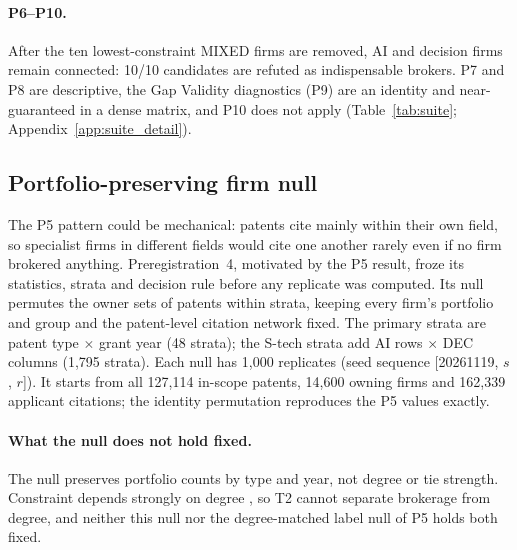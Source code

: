 \paragraph{P6--P10.} After the ten lowest-constraint MIXED firms are removed, AI and decision firms remain connected: 10/10 candidates are refuted as indispensable brokers. P7 and P8 are descriptive, the Gap Validity diagnostics (P9) are an identity and near-guaranteed in a dense matrix, and P10 does not apply (Table~\ref{tab:suite}; Appendix~\ref{app:suite_detail}).

\subsection{Portfolio-preserving firm null}
\label{sec:study2_firm}

The P5 pattern could be mechanical: patents cite mainly within their own field, so specialist firms in different fields would cite one another rarely even if no firm brokered anything. Preregistration~4, motivated by the P5 result, froze its statistics, strata and decision rule before any replicate was computed. Its null permutes the owner sets of patents within strata, keeping every firm's portfolio and group and the patent-level citation network fixed. The primary strata are patent type $\times$ grant year (48 strata); the S-tech strata add AI rows $\times$ DEC columns (1,795 strata). Each null has 1,000 replicates (seed sequence [20261119, $s$, $r$]). It starts from all 127,114 in-scope patents, 14,600 owning firms and 162,339 applicant citations; the identity permutation reproduces the P5 values exactly.

\paragraph{What the null does not hold fixed.} The null preserves portfolio counts by type and year, not degree or tie strength. Constraint depends strongly on degree \citep{everett2020unpacking}, so T2 cannot separate brokerage from degree, and neither this null nor the degree-matched label null of P5 holds both fixed.

